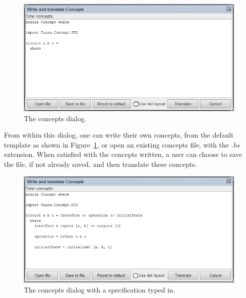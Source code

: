\documentclass[british,conference,compsoc]{IEEEtran}
\begin{document}
\begin{figure}[h]
\begin{centering}
\includegraphics[scale=0.45]{Images/concepts_dialog_screenshot.png}
\par\end{centering}

\begin{centering}
\protect\caption{\label{fig:concepts_dialog_screenshot}The concepts dialog.}

\par\end{centering}

\end{figure}

From within this dialog, one can write their own concepts, from the default 
template as shown in Figure~\ref{fig:concepts_dialog_screenshot}, or open an 
existing concepts file, with the \emph{.hs} extension. When satisfied with the 
concepts written, a user can choose to save the file, if not already saved, and
then translate these concepts.

\begin{figure}[H]
\begin{centering}
\includegraphics[scale=0.45]{Images/concepts_dialog_or_gate.png}
\par\end{centering}

\begin{centering}
\protect\caption{\label{fig:concepts_dialog_or_gate}The concepts dialog with a 
			specification typed in.}

\par\end{centering}

\end{figure}
\end{document}
